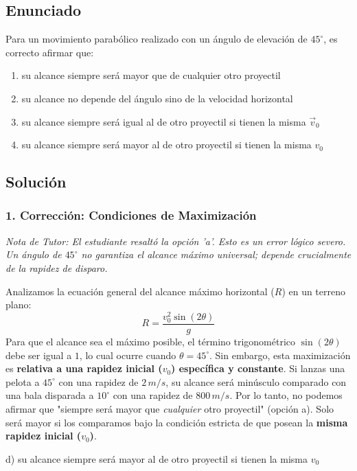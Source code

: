 \documentclass[12pt, a4paper]{article}
\begin{document}
\newpage

\subsection*{Enunciado}
Para un movimiento parabólico realizado con un ángulo de elevación de $45^\circ$, es correcto afirmar que:
\begin{enumerate}[label=\alph*)]
    \item su alcance siempre será mayor que de cualquier otro proyectil
    \item su alcance no depende del ángulo sino de la velocidad horizontal
    \item su alcance siempre será igual al de otro proyectil si tienen la misma $\vec{v}_0$
    \item su alcance siempre será mayor al de otro proyectil si tienen la misma $v_0$
\end{enumerate}

\subsection*{Solución}

\subsubsection*{1. Corrección: Condiciones de Maximización}
\textit{Nota de Tutor: El estudiante resaltó la opción 'a'. Esto es un error lógico severo. Un ángulo de $45^\circ$ no garantiza el alcance máximo universal; depende crucialmente de la rapidez de disparo.}

Analizamos la ecuación general del alcance máximo horizontal ($R$) en un terreno plano:
$$ R = \frac{v_0^2 \sin(2\theta)}{g} $$
Para que el alcance sea el máximo posible, el término trigonométrico $\sin(2\theta)$ debe ser igual a $1$, lo cual ocurre cuando $\theta = 45^\circ$.
Sin embargo, esta maximización es \textbf{relativa a una rapidez inicial ($v_0$) específica y constante}. 
Si lanzas una pelota a $45^\circ$ con una rapidez de $2\,\si{m/s}$, su alcance será minúsculo comparado con una bala disparada a $10^\circ$ con una rapidez de $800\,\si{m/s}$. 
Por lo tanto, no podemos afirmar que "siempre será mayor que \textit{cualquier} otro proyectil" (opción a). Solo será mayor si los comparamos bajo la condición estricta de que posean la \textbf{misma rapidez inicial ($v_0$)}.

\begin{tcolorbox}[colback=green!5!white, colframe=green!50!black, title=Respuesta Final]
\centering \Large d) su alcance siempre será mayor al de otro proyectil si tienen la misma $v_0$
\end{tcolorbox}
\end{document}
